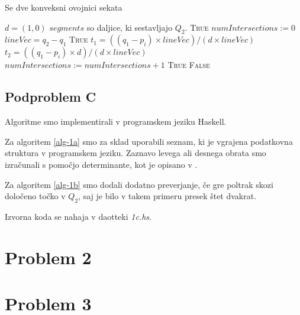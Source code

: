 \documentclass{article}
\begin{document}
\begin{algorithm}
	\caption{Se dve konveksni ovojnici sekata}
	\label{alg-1b}

	\begin{algorithmic}[1]
			\State $d = (1, 0)$
			\State $segments$ so daljice, ki sestavljajo $Q_2$.
				 \Return \textsc{True}
				\EndIf
				\State $numIntersections := 0$
				\State $lineVec = q_2 - q_1$
						 \Return \textsc{True}
						\EndIf
					\EndIf
					\State $t_1 = ((q_1 - p_i) \times lineVec) / (d \times lineVec)$
					\State $t_2 = ((q_1 - p_i) \times d) / (d \times lineVec)$
						\State $numIntersections := numIntersections + 1$
					\EndIf
				\EndFor
				 \Return \textsc{True}
				\EndIf
			\EndFor
			\State \Return \textsc{False}
		\EndFunction
	\end{algorithmic}
\end{algorithm}


\subsection{Podproblem C}

Algoritme smo implementirali v programskem jeziku Haskell.

Za algoritem \ref{alg-1a} smo za sklad uporabili seznam, ki je vgrajena podatkovna struktura v programskem jeziku. Zaznavo levega ali desnega obrata smo izračunali s pomočjo determinante, kot je opisano v \cite{cormen2009introduction}.

Za algoritem \ref{alg-1b} smo dodali dodatno preverjanje, če gre poltrak skozi določeno točko v $Q_2$, saj je bilo v takem primeru presek štet dvakrat.

Izvorna koda se nahaja v daotteki \textit{1c.hs}.

\section{Problem 2}

\section{Problem 3}



\end{document}
